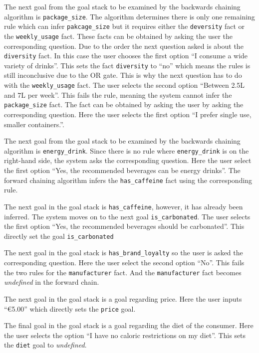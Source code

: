 \documentclass[11pt,a4paper]{article}
\begin{document}
The next goal from the goal stack to be examined by the backwards chaining algorithm is \verb|package_size|. The algorithm determines there is only one remaining rule which can infer \verb|pakcage_size| but it requires either the \verb|deversity| fact or the \verb|weekly_usage| fact. These facts can be obtained by asking the user the corresponding question. Due to the order the next question asked is about the \verb|diversity| fact. In this case the user chooses the first option ``I consume a wide variety of drinks''. This sets the fact \verb|diversity| to ``no'' which means the rules is still inconclusive due to the OR gate. This is why the next question has to do with the \verb|weekly_usage| fact. The user selects the second option ``Between 2.5L and 7L per week''. This fails the rule, meaning the system cannot infer the \verb|package_size| fact. The fact can be obtained by asking the user by asking the corresponding question. Here the user selects the first option ``I prefer single use, smaller containers.''.

The next goal from the goal stack to be examined by the backwards chaining algorithm is \verb|energy_drink|. Since there is no rule where \verb|energy_drink| is on the right-hand side, the system asks the corresponding question. Here the user select the first option ``Yes, the recommended beverages can be energy drinks''. The forward chaining algorithm infers the \verb|has_caffeine| fact using the corresponding rule.

The next goal in the goal stack is \verb|has_caffeine|, however, it has already been inferred. The system moves on to the next goal \verb|is_carbonated|. The user selects the first option ``Yes, the recommended beverages should be carbonated''. This directly set the goal \verb|is_carbonated|

The next goal in the goal stack is \verb|has_brand_loyalty| so the user is asked the corresponding question. Here the user select the second option ``No''. This fails the two rules for the \verb|manufacturer| fact. And the \verb|manufacturer| fact becomes \textit{undefined} in the forward chain.

The next goal in the goal stack is a goal regarding price. Here the user inputs ``\euro 5.00'' which directly sets the \verb|price| goal.

The final goal in the goal stack is a goal regarding the diet of the consumer. Here the user selects the option ``I have no caloric restrictions on my diet''. This sets the \verb|diet| goal to \textit{undefined}.
\end{document}
